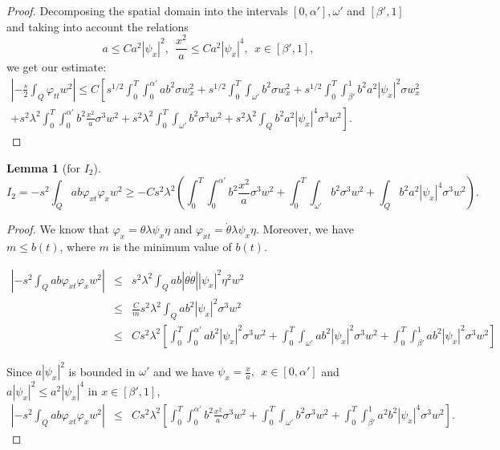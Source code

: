 \documentclass[11pt,oneside,a4papper]{osajnl}
\newtheorem{lema}{Lemma}
\begin{document}
\begin{proof}
Decomposing the spatial domain into the intervals $[0,\alpha'], \omega' $ and $[\beta',1]$ and taking into account the relations
$$a\leq C a^2 |\psi_x|^2,  \ \ \frac{x^2}{a}\leq Ca^2|\psi_x|^4, \ \ x\in[\beta',1], $$
we get our estimate:
\begin{multline*}
	\left|-\frac{s}{2}\int_{Q}\varphi_{tt} w^2 \right|\leq C\left[ s^{1/2}\int_0^T \int_0^{\alpha'} ab^2\sigma  w_x^2 + s^{1/2}\int_0^T\int_{\omega'} b^2 \sigma w_x^2 + s^{1/2}\int_{0}^{T} \int_{\beta'}^{1} b^2 a^2 |\psi_x|^2 \sigma w_x^2\right.\\
	\left.+s^2\lambda^2\int_0^T \int_0^{\alpha'} b^2 \frac{x^2}{a} \sigma^3 w^2 + s^2\lambda^2\int_0^T\int_{\omega'} b^2 \sigma^3 w^2 +s^2\lambda^2 \int_Q b^2 a^2 |\psi_x|^4 \sigma^3 w^2\right].
\end{multline*}
\end{proof}

\begin{lema}[for $I_2$]\label{lemaA3}
	$$I_2=-s^2\int_{Q} ab\varphi_{xt}\varphi_x  w^2 \geq
	- C s^2 \lambda^2 \left( \int_0^T \int_0^{\alpha'} b^2 \frac{x^2}{a} \sigma^3 w^2 + \int_0^T\int_{\omega'} b^2 \sigma^3 w^2 + \int_Q b^2 a^2 |\psi_x|^4 \sigma^3 w^2 \right).$$
\end{lema}	
\begin{proof}
    We know that $\varphi_x=\theta \lambda \psi_x \eta$ and $\varphi_{xt}=\dot{\theta}\lambda \psi_x \eta$. Moreover, we have $m \leq b(t)$, where $m$ is the minimum value of $b(t)$. 

	\begin{eqnarray*}
		\left| -s^2\int_{Q} ab\varphi_{xt}\varphi_x  w^2 \right|	&\leq &s^2\lambda^2 \int_{Q} ab|\theta \dot{\theta}| |\psi_x|^2 \eta^2 w^2\\
		&\leq & \frac{C}{m}s^2\lambda^2 \int_{Q} ab^2 |\psi_x|^2 \sigma^3 w^2\\
		&\leq & Cs^2\lambda^2\left[ \int_{0}^{T} \int_{0}^{\alpha'} ab^2 |\psi_x|^2 \sigma^3 w^2 +  \int_{0}^{T} \int_{\omega'}ab^2 |\psi_x|^2 \sigma^3 w^2+\int_{0}^{T} \int_{\beta'}^{1}ab^2 |\psi_x|^2 \sigma^3 w^2 \right]
	\end{eqnarray*}
    
	Since $a|\psi_x|^2$ is bounded in $\omega'$ and we have $\psi_x=\frac{x}{a}, \ \ x\in [0,\alpha']$ and  $a|\psi_x|^2\leq a^2|\psi_x|^4$ in $x\in[\beta',1]$, 
	\begin{eqnarray*}
		\left| -s^2\int_{Q} ab\varphi_{xt}\varphi_x  w^2 \right|	&\leq & Cs^2\lambda^2\left[ \int_{0}^{T} \int_{0}^{\alpha'} b^2 \frac{x^2}{a} \sigma^3 w^2 +  \int_{0}^{T} \int_{\omega'}b^2  \sigma^3 w^2+\int_{0}^{T} \int_{\beta'}^{1}a^2b^2 |\psi_x|^4 \sigma^3 w^2 \right].
	\end{eqnarray*}
\end{proof}
\end{document}
